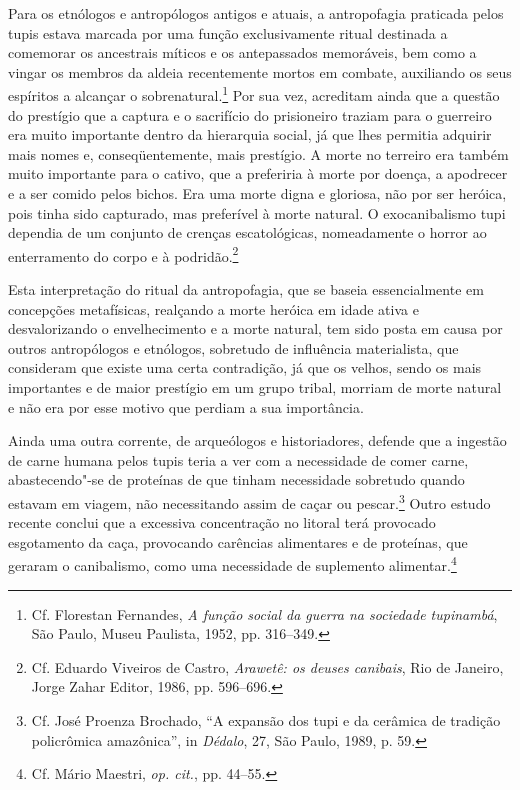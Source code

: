 Para os etnólogos e antropólogos antigos e atuais, a antropofagia
praticada pelos tupis estava marcada por uma função exclusivamente
ritual destinada a comemorar os ancestrais míticos e os antepassados
memoráveis, bem como a vingar os membros da aldeia recentemente mortos
em combate, auxiliando os seus espíritos a alcançar o 
sobrenatural.\footnote{ Cf. Florestan Fernandes, \textit{A função social da
guerra na sociedade tupinambá}, São Paulo, Museu Paulista, 1952, pp. 316--349.} 
Por sua vez, acreditam ainda que a questão do prestígio que a
captura e o sacrifício do prisioneiro traziam para o guerreiro era
muito importante dentro da hierarquia social, já que lhes permitia
adquirir mais nomes e, conseqüentemente, mais prestígio. A morte no
terreiro era também muito importante para o cativo, que a preferiria à
morte por doença, a apodrecer e a ser comido pelos bichos. Era uma
morte digna e gloriosa, não por ser heróica, pois tinha sido capturado,
mas preferível à morte natural. O exocanibalismo tupi dependia de um
conjunto de crenças escatológicas, nomeadamente o horror ao
enterramento do corpo e à podridão.\footnote{ Cf. Eduardo
Viveiros de Castro, \textit{Arawetê: os deuses canibais}, Rio de
Janeiro, Jorge Zahar Editor, 1986, pp. 596--696.}

Esta interpretação do ritual da antropofagia, que se baseia
essencialmente em concepções metafísicas, realçando a morte heróica em
idade ativa e desvalorizando o envelhecimento e a morte natural, tem
sido posta em causa por outros antropólogos e etnólogos, sobretudo de
influência materialista, que consideram que existe uma certa
contradição, já que os velhos, sendo os mais importantes e de maior
prestígio em um grupo tribal, morriam de morte natural e não era por
esse motivo que perdiam a sua importância.

Ainda uma outra corrente, de arqueólogos e historiadores, defende que
a ingestão de carne humana pelos tupis teria a ver com a necessidade de
comer carne, abastecendo"-se de proteínas de que tinham necessidade
sobretudo quando estavam em viagem, não necessitando assim de caçar ou
pescar.\footnote{ Cf. José Proenza Brochado, ``A expansão dos tupi e
da cerâmica de tradição policrômica amazônica'', in \textit{Dédalo}, 27,
São Paulo, 1989, p. 59.} Outro estudo recente conclui que a excessiva
concentração no litoral terá provocado esgotamento da caça, provocando
carências alimentares e de proteínas, que geraram o canibalismo, como
uma necessidade de suplemento alimentar.\footnote{ Cf. Mário
Maestri, \textit{op. cit.}, pp. 44--55.}

